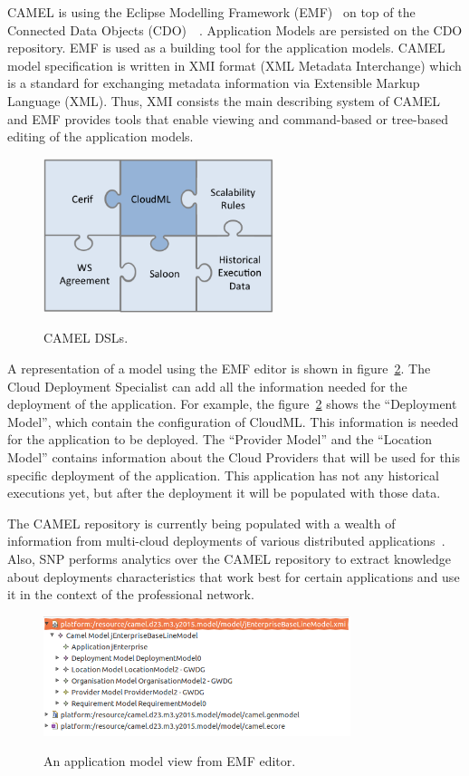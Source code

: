 CAMEL is using the Eclipse Modelling Framework (EMF)~\cite{steinberg2008emf} on top of the Connected Data Objects (CDO)~\cite{cdomodel}~\cite{paasage-d4.1.1}. Application Models are persisted on the CDO repository. EMF is used as a building tool for the application models. CAMEL model specification is written in XMI format (XML Metadata Interchange) which is a standard for exchanging metadata information via Extensible Markup Language (XML). Thus, XMI consists the main describing system of CAMEL and EMF provides tools that enable viewing and command-based or tree-based editing of the application models. 

\begin{figure}[h]
	\caption{CAMEL DSLs.}
	\includegraphics[width=0.6\textwidth,natwidth=200,natheight=150]{./fig/dsl.png}
	\centering
	\label{fig:dsls}
\end{figure}

A representation of a model using the EMF editor is shown in figure~\ref{fig:app_view_emf}. The Cloud Deployment Specialist can add all the information needed for the deployment of the application. For example, the figure~\ref{fig:app_view_emf} shows the ``Deployment Model'', which contain the configuration of CloudML. This information is needed for the application to be deployed. The ``Provider Model'' and the ``Location Model'' contains information about the Cloud Providers that will be used for this specific deployment of the application. This application has not any historical executions yet, but after the deployment it will be populated with those data.
 
The CAMEL repository is currently being populated with a wealth of information from multi-cloud deployments of various distributed applications~\cite{Papaioannou2013}. Also, SNP performs analytics over the CAMEL repository to extract knowledge about deployments characteristics that work best for certain applications and use it in the context of the professional network.

\begin{figure}[h]
	\caption{An application model view from EMF editor.}
	\includegraphics[width=0.8\textwidth,natwidth=200,natheight=150]{./fig/camel_model_example.png}
	\centering
	\label{fig:app_view_emf}
\end{figure}

